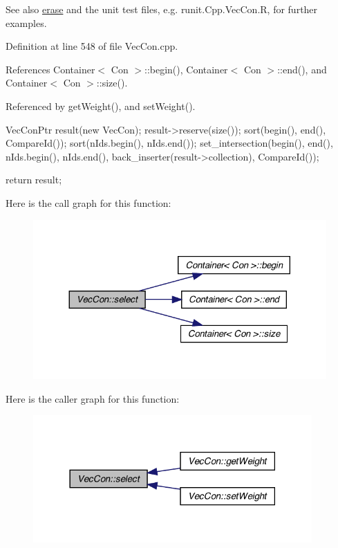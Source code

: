 \begin{DoxySeeAlso}{See also}
\hyperlink{class_vec_con_a930078dc6021e192d9a01bb520de66ab}{erase} and the unit test files, e.g. runit.Cpp.VecCon.R, for further examples. 
\end{DoxySeeAlso}


Definition at line 548 of file VecCon.cpp.



References Container$<$ Con $>$::begin(), Container$<$ Con $>$::end(), and Container$<$ Con $>$::size().



Referenced by getWeight(), and setWeight().


\begin{DoxyCode}
{
  VecConPtr result(new VecCon);
  result->reserve(size());
  sort(begin(), end(), CompareId());
  sort(nIds.begin(), nIds.end());
  set_intersection(begin(), end(), nIds.begin(), nIds.end(),
      back_inserter(result->collection), CompareId());

  return result;
}
\end{DoxyCode}


Here is the call graph for this function:
\nopagebreak
\begin{figure}[H]
\begin{center}
\leavevmode
\includegraphics[width=324pt]{class_vec_con_a6fe488b3fe3834fe7cf5553fb4471c78_cgraph}
\end{center}
\end{figure}




Here is the caller graph for this function:
\nopagebreak
\begin{figure}[H]
\begin{center}
\leavevmode
\includegraphics[width=302pt]{class_vec_con_a6fe488b3fe3834fe7cf5553fb4471c78_icgraph}
\end{center}
\end{figure}


